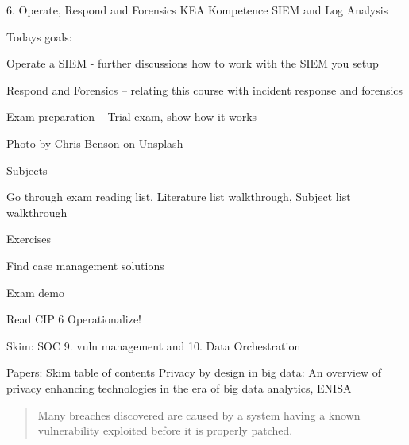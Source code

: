 \documentclass[Screen16to9,17pt]{foils}
\begin{document}
\mytitlepage
{6. Operate, Respond and Forensics}
{KEA Kompetence SIEM and Log Analysis}





Todays goals:
\begin{list2}
\item Operate a SIEM - further discussions how to work with the SIEM you setup
\item Respond and Forensics -- relating this course with incident response and forensics
\item Exam preparation --  Trial exam, show how it works
\end{list2}

 Photo by Chris Benson on Unsplash


\begin{list1}
\item Subjects
\begin{list2}
\item Go through exam reading list, Literature list walkthrough, Subject list walkthrough
\end{list2}
\item Exercises
\begin{list2}
\item Find case management solutions
\item Exam demo
\end{list2}
\end{list1}


\begin{list1}
\item Read CIP 6 Operationalize!
\item Skim: SOC 9. vuln management and 10. Data Orchestration
\item Papers: Skim table of contents Privacy by design in big data: An overview of privacy enhancing technologies in the era of big data analytics, ENISA
\item
\end{list1}




\begin{quote}
Many breaches discovered are caused by a system having a known vulnerability exploited before it is properly patched.
\end{quote}
\end{document}
